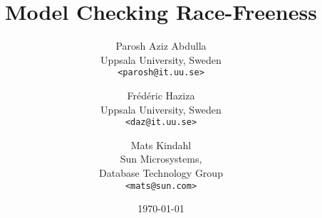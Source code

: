 \usepackage[english]{babel}
\usepackage[utf8]{inputenc}

\usepackage[T1]{fontenc}



\title{Model Checking Race-Freeness}

\author{
  Parosh Aziz Abdulla\\Uppsala University, Sweden\\\texttt{<parosh@it.uu.se>}\\
  \and
  Frédéric Haziza\\Uppsala University, Sweden\\\texttt{<daz@it.uu.se>}\\
   \and
   Mats Kindahl\\Sun Microsystems,\\Database Technology Group\\\texttt{<mats@sun.com>}\\
}


\date{\today}


\usepackage{graphics}
\usepackage{amscd,amssymb}
\usepackage{enumerate}
\usepackage{latexsym}
\usepackage{xspace}
\usepackage{hhline}

\usepackage[version=latest]{pgf}
\usepackage{tikz}
\usetikzlibrary{%
  arrows,%
  calc,%
  calendar,%
  fit,%
  shapes,%
  shapes.geometric,%
  shapes.misc,%
  shapes.symbols,%
  shapes.arrows,%
  shapes.callouts,%
  shapes.multipart,%
  backgrounds,%
  matrix,%
  fadings,%
  through,%
  positioning,%
  scopes,%
  decorations.shapes,%
  decorations.pathmorphing,%
  decorations.text,%
  shadows,%
  trees,%
  snakes,%
  petri,%
  automata,%
  backgrounds%
}

\usepackage{listings}

\usepackage[noend]{algorithmic}

